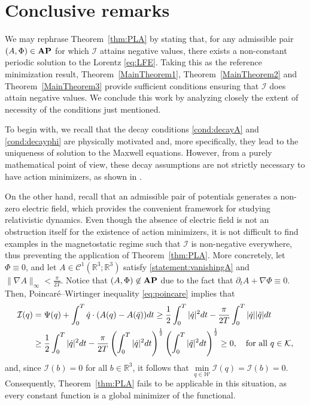 \documentclass{article}
\newcommand{\boC}{\mathcal{C}}
\newcommand{\boK}{\mathcal{K}}
\newcommand{\boI}{\mathcal{I}}
\newcommand{\R}{\mathbb{R}}
\newcommand{\boW}{\mathcal{W}}
\newcommand{\dq}{\dot{q}}
\newcommand{\AP}{\textnormal{\textbf{AP}}}
\theoremstyle{definition}
\begin{document}
\section{Conclusive remarks}\label{Section-conclusions}

We may rephrase Theorem~\ref{thm:PLA} by stating that, for any admissible pair $(A,\Phi)\in\AP$ for which $\boI$ attains negative values, there exists a non-constant periodic solution to the Lorentz \eqref{eq:LFE}. Taking this as the reference minimization result,  Theorem~\ref{MainTheorem1}, Theorem~\ref{MainTheorem2} and Theorem~\ref{MainTheorem3} provide sufficient conditions ensuring that $\boI$ does attain negative values. We conclude this work by analyzing closely the extent of necessity of the conditions just mentioned.

To begin with, we recall that the decay conditions \eqref{cond:decayA} and \eqref{cond:decayphi} are physically motivated and, more specifically, they lead to the uniqueness of solution to the Maxwell equations. However, from a purely mathematical point of view, these decay assumptions are not strictly necessary  to have action minimizers, as shown in \cite{ABT}. 

On the other hand, recall that an admissible pair of potentials generates a non-zero electric field, which provides the convenient framework for studying relativistic dynamics. Even though the absence of electric field is not an obstruction itself for the existence of action minimizers, it is not difficult to find examples in the magnetostatic regime such that $\boI$ is non-negative everywhere, thus preventing the application of Theorem~\ref{thm:PLA}. More concretely, let $\Phi\equiv 0$, and let $A\in\boC^1(\R^3;\R^3)$ satisfy \eqref{statement:vanishingA} and $\|\nabla A\|_{\infty} <\frac{\pi}{2T}$. Notice that $(A,\Phi)\not\in\AP$ due to the fact that $\partial_t A + \nabla\Phi\equiv 0$. Then, Poincaré--Wirtinger inequality \eqref{eq:poincare} implies that
    \begin{align*}
        \boI(q)&=\Psi(q) + \int_0^T \dq\cdot (A(q)-A(\bar q))dt\geq\frac12\int_0^T|\dq|^2 dt - \frac{\pi}{2T}\int_0^T |\dq||\tilde q| dt
        \\
        &\geq \frac12\int_0^T|\dq|^2 dt - \frac{\pi}{2T}\left(\int_0^T |\dq|^2 dt\right)^\frac12\left(\int_0^T|\tilde q|^2 dt\right)^\frac12\geq 0,\quad\hbox{for all }q\in\boK,
    \end{align*}
and, since $\boI(b)=0$ for all $b\in\R^3$, it follows that $\min\limits_{q\in\boW}\boI(q)=\boI(b)=0$. Consequently, Theorem~\ref{thm:PLA} fails to be applicable in this situation, as every constant function is a global minimizer of the functional.
\end{document}

